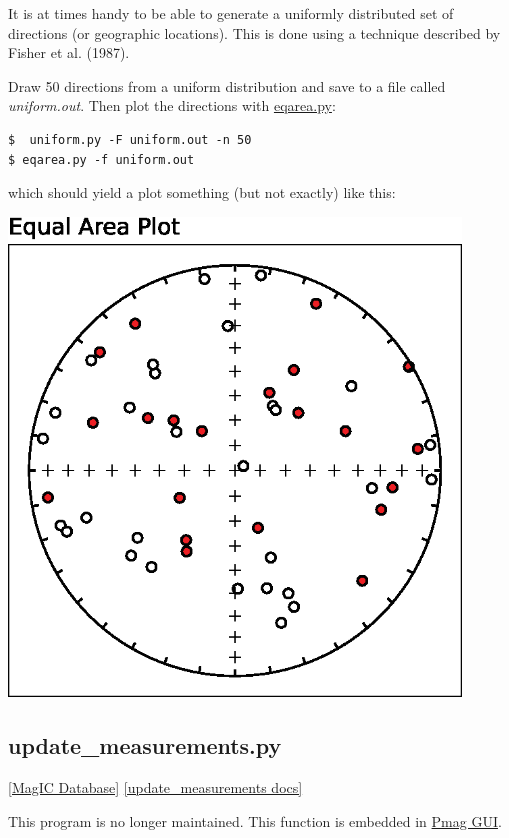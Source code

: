 \documentclass[11pt]{book}
\begin{document}
{It is at times handy to be able to generate a uniformly distributed set of directions (or geographic locations).  This is done using a technique described by Fisher et al. (1987).

Draw 50 directions from a uniform distribution and save to a file called {\it uniform.out}.  Then plot the directions with \href{#eqarea.py}{eqarea.py}:

\begin{verbatim}
$  uniform.py -F uniform.out -n 50
$ eqarea.py -f uniform.out
\end{verbatim}

which should yield a plot something (but not exactly) like this:

\includegraphics[width=12cm]{EPSfiles/uniform.eps}



\subsection{update\_measurements.py}
\href{#MagICDatabase}{[MagIC Database]}
\href{https://github.com/PmagPy/PmagPy/blob/master/programs/update_measurements.py}{[update\_measurements docs]}

This program is no longer maintained. This function is embedded in  \href{#pmag_gui.py}{Pmag GUI}.   



}
\end{document}
